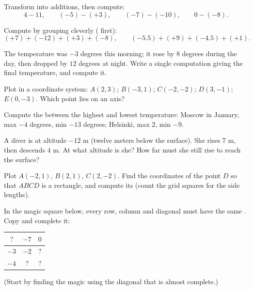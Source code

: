 \begin{exercise}[$\star$]\label{exo:g7:negatives:5}
Transform into additions, then compute:
\[
4 - 11, \qquad
(-5) - (+3), \qquad
(-7) - (-10), \qquad
0 - (-8).
\]
\end{exercise}

\begin{exercise}[$\star$]\label{exo:g7:negatives:6}
Compute by grouping cleverly ( first):
\[
(+7) + (-12) + (+3) + (-8), \qquad
(-5.5) + (+9) + (-4.5) + (+1).
\]
\end{exercise}

\begin{exercise}[$\star$]\label{exo:g7:negatives:7}
The temperature was $-3$ degrees this morning; it rose by $8$ degrees
during the day, then dropped by $12$ degrees at night. Write a single
computation giving the final temperature, and compute it.
\end{exercise}

\begin{exercise}[$\star$]\label{exo:g7:negatives:8}
Plot in a coordinate system: $A(2, 3)$; $B(-3, 1)$; $C(-2, -2)$;
$D(3, -1)$; $E(0, -3)$. Which point lies on an axis?
\end{exercise}

\begin{exercise}[$\star\star$]\label{exo:g7:negatives:9}
Compute the  between the highest and lowest temperature:
Moscow in January, max $-4$ degrees, min $-13$ degrees; Helsinki, max
$2$, min $-9$.
\end{exercise}

\begin{exercise}[$\star\star$]\label{exo:g7:negatives:10}
A diver is at altitude $-12$ m (twelve meters below the surface). She
rises $7$ m, then descends $4$ m. At what altitude is she? How far
must she still rise to reach the surface?
\end{exercise}

\begin{exercise}[$\star\star$]\label{exo:g7:negatives:11}
Plot $A(-2, 1)$, $B(2, 1)$, $C(2, -2)$. Find the coordinates of the
point $D$ so that $ABCD$ is a rectangle, and compute its 
(count the grid squares for the side lengths).
\end{exercise}

\begin{exercise}[$\star\star\star$]\label{exo:g7:negatives:12}
In the magic square below, every row, column and diagonal must have
the same . Copy and complete it:
\begin{center}
\renewcommand{\arraystretch}{1.4}
\begin{tabular}{|c|c|c|}
\hline
$?$ & $-7$ & $0$ \\
\hline
$-3$ & $-2$ & $?$ \\
\hline
$-4$ & $?$ & $?$ \\
\hline
\end{tabular}
\end{center}
(Start by finding the magic  using the diagonal that is almost
complete.)
\end{exercise}
